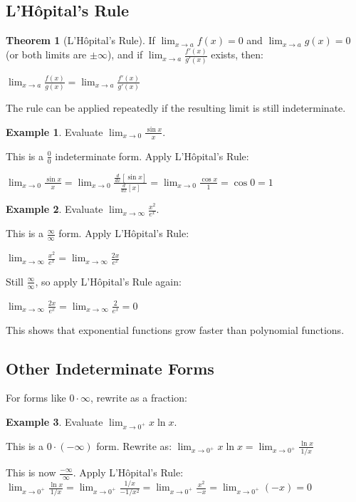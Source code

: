 \documentclass[12pt,a4paper]{book}
\theoremstyle{definition}
\newtheorem{example}{Example}[chapter]
\newtheorem{theorem}{Theorem}[chapter]
\begin{document}
\subsection{L'Hôpital's Rule}

\begin{theorem}[L'Hôpital's Rule]
If $\lim_{x \to a} f(x) = 0$ and $\lim_{x \to a} g(x) = 0$ (or both limits are $\pm\infty$), and if $\lim_{x \to a} \frac{f'(x)}{g'(x)}$ exists, then:

$\lim_{x \to a} \frac{f(x)}{g(x)} = \lim_{x \to a} \frac{f'(x)}{g'(x)}$

The rule can be applied repeatedly if the resulting limit is still indeterminate.
\end{theorem}

\begin{example}
Evaluate $\lim_{x \to 0} \frac{\sin x}{x}$.

This is a $\frac{0}{0}$ indeterminate form. Apply L'Hôpital's Rule:

$\lim_{x \to 0} \frac{\sin x}{x} = \lim_{x \to 0} \frac{\frac{d}{dx}[\sin x]}{\frac{d}{dx}[x]} = \lim_{x \to 0} \frac{\cos x}{1} = \cos 0 = 1$
\end{example}

\begin{example}
Evaluate $\lim_{x \to \infty} \frac{x^2}{e^x}$.

This is a $\frac{\infty}{\infty}$ form. Apply L'Hôpital's Rule:

$\lim_{x \to \infty} \frac{x^2}{e^x} = \lim_{x \to \infty} \frac{2x}{e^x}$

Still $\frac{\infty}{\infty}$, so apply L'Hôpital's Rule again:

$\lim_{x \to \infty} \frac{2x}{e^x} = \lim_{x \to \infty} \frac{2}{e^x} = 0$

This shows that exponential functions grow faster than polynomial functions.
\end{example}

\subsection{Other Indeterminate Forms}

For forms like $0 \cdot \infty$, rewrite as a fraction:

\begin{example}
Evaluate $\lim_{x \to 0^+} x \ln x$.

This is a $0 \cdot (-\infty)$ form. Rewrite as:
$\lim_{x \to 0^+} x \ln x = \lim_{x \to 0^+} \frac{\ln x}{1/x}$

This is now $\frac{-\infty}{\infty}$. Apply L'Hôpital's Rule:
$\lim_{x \to 0^+} \frac{\ln x}{1/x} = \lim_{x \to 0^+} \frac{1/x}{-1/x^2} = \lim_{x \to 0^+} \frac{x^2}{-x} = \lim_{x \to 0^+} (-x) = 0$
\end{example}
\end{document}
